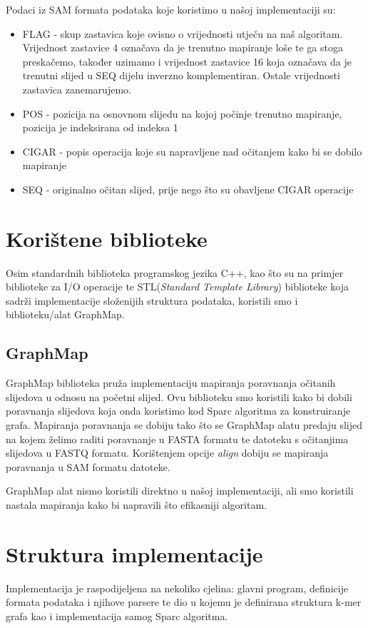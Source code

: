 \documentclass[times, utf8, seminar, numeric]{fer}
\begin{document}
Podaci iz SAM formata podataka koje koristimo u našoj implementaciji su:
\renewcommand{\labelitemi}{$\bullet$}
\begin{itemize}
	\item FLAG - skup zastavica koje ovisno o vrijednosti utječu na naš algoritam. Vrijednost zastavice 4 označava da je trenutno mapiranje loše te ga stoga preskačemo, također uzimamo i vrijednost zastavice 16 koja označava da je trenutni slijed u SEQ dijelu inverzno komplementiran. Ostale vrijednosti zastavica zanemarujemo.  
	\item POS - pozicija na osnovnom slijedu na kojoj počinje trenutno mapiranje, pozicija je indeksirana od indeksa 1
	\item CIGAR - popis operacija koje su napravljene nad očitanjem kako bi se dobilo mapiranje
	\item SEQ - originalno očitan slijed, prije nego što su obavljene CIGAR operacije
\end{itemize}

\section{Korištene biblioteke}
Osim standardnih biblioteka programskog jezika C++, kao što su na primjer biblioteke za I/O operacije te STL(\emph{Standard Template Library}) biblioteke koja sadrži implementacije složenijih struktura podataka, koristili smo i biblioteku/alat GraphMap.
\subsection{GraphMap} 
GraphMap \cite{graphmap} biblioteka pruža implementaciju mapiranja poravnanja očitanih slijedova u odnosu na početni slijed. Ovu biblioteku smo koristili kako bi dobili poravnanja slijedova koja onda koristimo kod Sparc algoritma za konstruiranje grafa. Mapiranja poravnanja se dobiju tako što se GraphMap alatu predaju slijed na kojem želimo raditi poravnanje u FASTA formatu te datoteku s očitanjima slijedova u FASTQ formatu. Korištenjem opcije \emph{align} dobiju se mapiranja poravnanja u SAM formatu datoteke.

GraphMap alat nismo koristili direktno u našoj implementaciji, ali smo koristili nastala mapiranja kako bi napravili što efikasniji algoritam.

\section{Struktura implementacije}
Implementacija je raspodijeljena na nekoliko cjelina: glavni program, definicije formata podataka i njihove parsere te dio u kojemu je definirana struktura k-mer grafa kao i implementacija samog Sparc algoritma.
\end{document}
